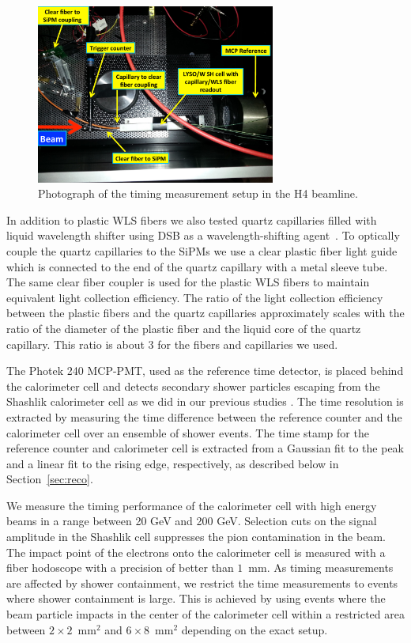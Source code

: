 \begin{figure}[htbp] 
\centering
\includegraphics[width=0.70\textwidth]{figures/ShashlikTBSetupDiagram} 
\caption{Photograph of the timing measurement setup in the H4 beamline.} 
\label{fig:TestbeamSetup} 
\end{figure} 

In addition to plastic WLS fibers we also tested quartz capillaries filled with
liquid wavelength shifter using DSB as a wavelength-shifting
agent~\cite{Baumbaugh:2016vcg}. To optically couple the quartz capillaries to the
SiPMs we use a clear plastic fiber light guide which is connected to the end of
the quartz capillary with a metal sleeve tube. The same clear fiber coupler is
used for the plastic WLS fibers to maintain equivalent light collection
efficiency. The ratio of the light collection efficiency between the plastic
fibers and the quartz capillaries approximately scales with the ratio of the
diameter of the plastic fiber and the liquid core of the quartz capillary. This
ratio is about $3$ for the fibers and capillaries we used.

The Photek 240 MCP-PMT, used as the reference time detector, is placed behind the
calorimeter cell and detects secondary shower particles escaping from the
Shashlik calorimeter cell as we did in our previous studies \cite{Anderson:2015gha}.
The time resolution is extracted by measuring the time difference between the
reference counter and the calorimeter cell over an ensemble of shower events.
The time stamp for the reference counter and calorimeter cell is extracted
from a Gaussian fit to the peak and a linear fit to the rising edge, 
respectively, as described below in Section~\ref{sec:reco}.

We measure the timing performance of the calorimeter cell with high energy beams
in a range between 20 GeV and 200 GeV. Selection cuts on the signal amplitude in the Shashlik cell
suppresses the pion contamination in the beam. The impact point of the electrons
onto the calorimeter cell is measured with a fiber hodoscope with a precision of
better than $1$~mm. As timing measurements are affected by shower containment,
we restrict the time measurements to events where shower containment is large.
This is achieved by using events where the beam particle impacts in the center
of the calorimeter cell within a restricted area between
$2\times2$~$\mathrm{mm}^{2}$ and $6\times8$~$\mathrm{mm}^{2}$ depending on the
exact setup. 

